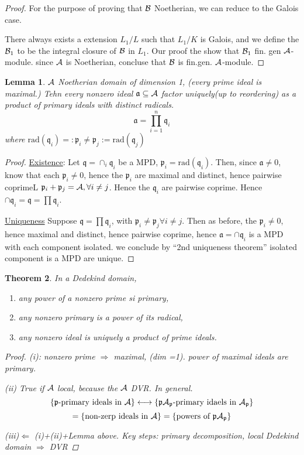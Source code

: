 \documentclass[11pt]{article}
\newtheorem{thm}{Theorem}[section]
\newtheorem{lemma}[thm]{Lemma}
\newcommand{\sca}{{\mathfrak a}}
\newcommand{\scp}{{\mathfrak p}}
\newcommand{\scq}{\mathfrak q}
\newcommand{\cala}{{\cal A}}
\newcommand{\calb}{{\cal B}}
\newcommand{\Lrta}{\Longrightarrow}
\newcommand{\llrta}{\longleftrightarrow}
\newcommand{\Llta}{\Longleftarrow}
\begin{document}
\begin{proof}
For the purpose of proving that $\calb$ Noetherian, we can reduce to the Galois case.

There always exists a extension $L_1/L$ such that $L_1/K$ is Galois, and we define the $\calb_1$ to be the integral closure of $\calb$ in $L_1$.
Our proof the show that $\calb_1$ fin. gen $\cala$-module. since $\cala$ is Noetherian, concluse that $\calb$ is fin.gen. $\cala$-module.
\end{proof}

\begin{lemma}
$\cala$ Noetherian domain of dimension 1, (every prime  ideal is maximal.) Tehn every nonzero ideal $\sca\subseteq \cala$ factor uniquely(up to reordering) as a product of primary ideals with distinct radicals.
$$
\sca=\prod_{i=1}^n\scq_i
$$
where $\text{rad}(\scq_i)=:\scp_i\neq \scp_j:=\text{rad}(\scq_j)$
\end{lemma}
\begin{proof}
\underline{Existence}: Let $\scq=\cap_i\scq_i$  be a MPD, $\scp_i=\text{rad}(\scq_i)$. Then, since $\sca\neq 0$, know that each $\scp_i\neq 0$, hence the $\scp_i$ are maximal and distinct, hence pairwise coprimeL $\scp_i+\scp_j=\cala,\forall i\neq j$. Hence the $\scq_i$ are pairwise coprime. Hence $\cap\scq_i=\scq=\prod\scq_i$.

\underline{Uniqueness} Suppose $\scq=\prod\scq_i$, with $\scp_i\neq \scp_j\forall i\neq j$. Then as before, the $\scp_i\neq 0$, hence maximal and distinct, hence pairwise coprime, hence $\sca=\cap \scq_i$ is a MPD with each component isolated. we conclude by ``2nd uniqueness theorem'' isolated component is a MPD are unique.
\end{proof}

\begin{thm}
In a Dedekind domain, 
\begin{enumerate}[label=(\roman*)]
\item any power of a nonzero prime si primary,
\item any nonzero primary  is a power of its radical,
\item any nonzero ideal is uniquely a product of prime ideals.
\end{enumerate}
\begin{proof}
(i): nonzero prime $\Lrta$ maximal, (dim =1). power of maximal ideals are primary.

(ii) True if $\cala$ local, because the $\cala$ DVR. In general.
$$
\{\scp\text{-primary ideals in }\cala\}\llrta \{\scp\cala_\scp\text{-primary idaels in }\cala_\scp\}
$$
$$
=\{\text{non-zerp ideals in $\cala$}\}=\{\text{powers of $\scp\cala_\scp$}\}
$$

(iii)$\Llta$ (i)+(ii)+Lemma above. 
Key steps: primary decomposition, local Dedekind domain $\Lrta$ DVR
\end{proof}
\end{thm}
\end{document}
